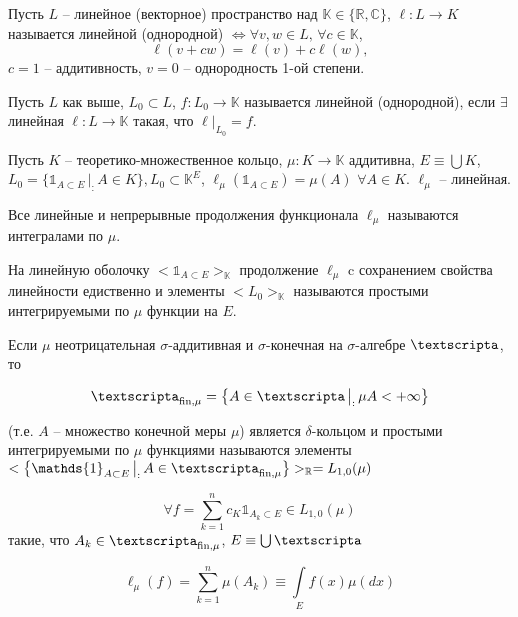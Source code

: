 \documentclass[a4paper, 12pt]{article}
\begin{document}
\begin{definition}
    Пусть $L$ -- линейное (векторное) пространство над $\mathbb{K} \in \{\mathbb{R}, \mathbb{C}\}$, $\ell:L \rightarrow K$ называется линейной (однородной) $\Leftrightarrow \forall v, w \in L, \, \forall c \in \mathbb{K}$, 
    $$\ell(v + cw) = \ell(v) + c\ell(w),$$ 
    $c = 1$ -- аддитивность, $v = 0$ -- однородность 1-ой степени.
\end{definition}

\begin{definition}
    Пусть $L$ как выше, $L_0 \subset L$, $f: L_0  \rightarrow \mathbb{K}$ называется линейной (однородной), если $\exists$ линейная $\ell: L \rightarrow \mathbb{K}$ такая, что $\ell \big|_{L_0} = f$.
\end{definition}

\begin{problem}
    Пусть $K$ -- теоретико-множественное кольцо, $\mu: K \rightarrow \mathbb{K}$ аддитивна, $E \equiv \bigcup K$, $L_0 = \{ \mathds{1}_{A \subset E} \,\big|_:\, A \in K\}, L_0 \subset \mathbb{K}^E$, $\ell_{\mu} (\mathds{1}_{A \subset E} ) = \mu (A) \,\,\forall A \in K$. $\ell_{\mu}$ -- линейная.
\end{problem}

\begin{definition}
    Все линейные и непрерывные продолжения функционала $\ell_{\mu}$ называются интегралами по $\mu$.
\end{definition}

\begin{problem}
    На линейную оболочку $<\mathds{1}_{A \subset E}>_{\mathbb{K}}$ продолжение $\ell_{\mu}$ c сохранением свойства линейности едиственно и элементы $<L_0>_{\mathbb{K}}$ называются простыми интегрируемыми по $\mu$ функции на $E$.
\end{problem}


Если $\mu$ неотрицательная $\sigma$-аддитивная и $\sigma$-конечная на $\sigma$-алгебре $\text{\textscripta}$, то 

$$\text{\textscripta}_{\text{fin,$\mu$}} = \left\{ A \in \text{\textscripta} \,\big|_:\, \mu A < + \infty \right\}$$

(т.е. $A$ -- множество конечной меры $\mu$) является $\delta$-кольцом и простыми интегрируемыми по $\mu$ функциями называются элементы $<\left\{ \mathds{1}_{A \subset E} \,\big|_:\, A \in \text{\textscripta}_{\text{fin,$\mu$}}  \right\}>_{\mathbb{R}} = L_{1, 0} (\mu)$

$$\forall f = \sum \limits_{k = 1}^{n} c_K \mathds{1}_{A_k \subset E} \in L_{1, 0}(\mu)$$ 
такие, что $A_k \in \text{\textscripta}_{\text{fin,$\mu$}}$, $E \equiv \bigcup \text{\textscripta} $

$$ \ell_{\mu}(f) = \sum \limits_{k = 1}^{n} \mu(A_k) \equiv \int \limits_{E} f(x) \mu(dx)$$  
\end{document}
